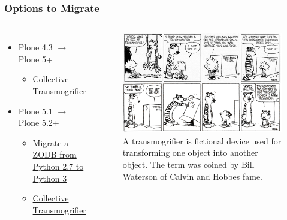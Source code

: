 \documentclass[aspectratio=169]{beamer}
\begin{document}
\begin{frame}
  \frametitle{Options to Migrate}

  \begin{columns}
    \begin{itemize}
      \item Plone 4.3 $\rightarrow$ Plone 5+
      \begin{itemize}
        \item \href{https://github.com/collective/collective.transmogrifier}{Collective Transmogrifier} \pause
      \end{itemize}
      \item Plone 5.1 $\rightarrow$ Plone 5.2+
      \begin{itemize}
        \item \href{https://docs.plone.org/manage/upgrading/version_specific_migration/upgrade_zodb_to_python3.html}{Migrate a ZODB from Python 2.7 to Python 3} \pause
        \item \href{https://github.com/collective/collective.transmogrifier}{Collective Transmogrifier} \pause
      \end{itemize}
    \end{itemize}
    \begin{figure}
      \includegraphics[height=.5\textheight]{./img/002_-_transmogrifier.png}
      \caption{A transmogrifier is fictional device used for transforming one object into another object. The term was coined by Bill Waterson of Calvin and Hobbes fame.}
    \end{figure}
  \end{columns}
\end{frame}
\end{document}
